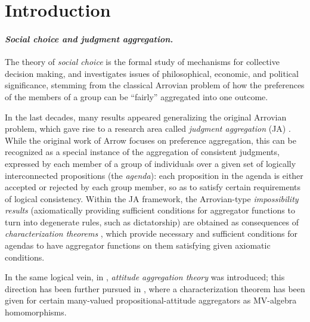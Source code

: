 \documentclass{llncs}
\numberwithin{equation}{section}
\begin{document}
\section{Introduction}

\paragraph{\bf\em Social choice and judgment aggregation.} The theory of {\em social choice} is the formal study of mechanisms for collective decision making, and investigates issues of philosophical, economic, and political significance, stemming from the classical Arrovian problem of how the preferences of the members of a group can be ``fairly'' aggregated into one outcome.

In the last decades, many results appeared generalizing the original Arrovian problem, which gave rise to a research area called {\em judgment aggregation} (JA) \cite{LP09}. While the original work of Arrow \cite{Ar63} focuses on preference aggregation, this can be recognized as a special instance of the aggregation of consistent judgments, expressed by each member of a group of individuals over a given set of logically interconnected propositions (the {\em agenda}): each proposition in the agenda is either accepted or rejected by each group member, so as to satisfy certain requirements of logical consistency. Within the JA framework, the Arrovian-type {\em impossibility results} (axiomatically providing  sufficient conditions for aggregator functions to turn into degenerate rules, such as dictatorship) are obtained as consequences of {\em characterization theorems} \cite{NP02}, which provide necessary and sufficient conditions for agendas to have aggregator functions on them satisfying given axiomatic conditions.

In the same logical vein, in \cite{DiLi10}, {\em attitude aggregation theory} was introduced; this direction has been further pursued in \cite{He13}, where a characterization theorem has been given for certain many-valued propositional-attitude aggregators as MV-algebra homomorphisms. 
\end{document}

